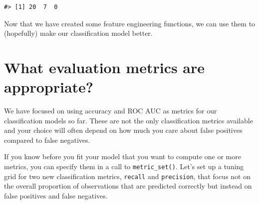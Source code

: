 \documentclass[
]{krantz}
\makeatletter
\newenvironment{Shaded}{\begin{snugshade}}{\end{snugshade}}
\newcommand{\ControlFlowTok}[1]{\textcolor[rgb]{0.13,0.29,0.53}{\textbf{#1}}}
\newcommand{\DecValTok}[1]{\textcolor[rgb]{0.00,0.00,0.81}{#1}}
\newcommand{\FunctionTok}[1]{\textcolor[rgb]{0.00,0.00,0.00}{#1}}
\newcommand{\NormalTok}[1]{#1}
\newcommand{\OtherTok}[1]{\textcolor[rgb]{0.56,0.35,0.01}{#1}}
\newcommand{\SpecialCharTok}[1]{\textcolor[rgb]{0.00,0.00,0.00}{#1}}
\newcommand{\StringTok}[1]{\textcolor[rgb]{0.31,0.60,0.02}{#1}}
\newenvironment{kframe}{%
\medskip{}
\setlength{\fboxsep}{.8em}
 \def\at@end@of@kframe{}%
 \ifinner\ifhmode%
  \def\at@end@of@kframe{\end{minipage}}%
  \begin{minipage}{\columnwidth}%
 \fi\fi%
 \def\FrameCommand##1{\hskip\@totalleftmargin \hskip-\fboxsep
 \colorbox{shadecolor}{##1}\hskip-\fboxsep
     \hskip-\linewidth \hskip-\@totalleftmargin \hskip\columnwidth}%
 \MakeFramed {\advance\hsize-\width
   \@totalleftmargin\z@ \linewidth\hsize
   \@setminipage}}%
 {\par\unskip\endMakeFramed%
 \at@end@of@kframe}
\renewenvironment{Shaded}{\begin{kframe}}{\end{kframe}}
\makeatother
\begin{document}
\begin{Shaded}
\end{Shaded}

\begin{verbatim}
#> [1] 20  7  0
\end{verbatim}

Now that we have created some feature engineering functions, we can use them to (hopefully) make our classification model better.

\hypertarget{what-evaluation-metrics-are-appropriate-1}{%
\section{What evaluation metrics are appropriate?}\label{what-evaluation-metrics-are-appropriate-1}}

We have focused on using accuracy and ROC AUC as metrics for our classification models so far. These are not the only classification metrics available and your choice will often depend on how much you care about false positives compared to false negatives.

If you know before you fit your model that you want to compute one or more metrics, you can specify them in a call to \texttt{metric\_set()}. Let's set up a tuning grid for two new classification metrics, \texttt{recall} and \texttt{precision}, that focus not on the overall proportion of observations that are predicted correctly but instead on false positives and false negatives.
\end{document}
